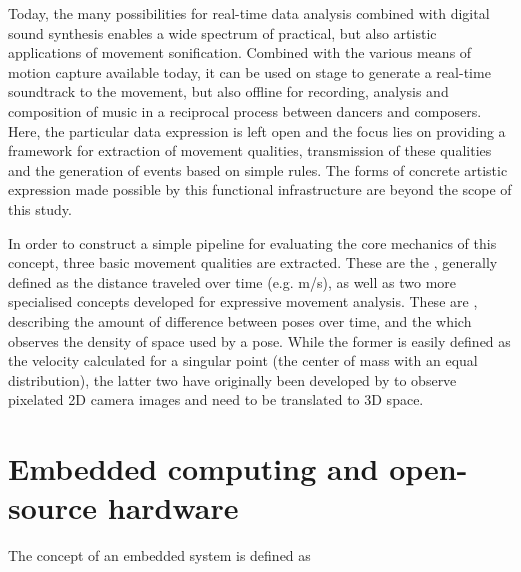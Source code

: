 Today, the many possibilities for real-time data analysis combined with digital sound synthesis enables a wide spectrum of practical, but also artistic applications of movement sonification. Combined with the various means of motion capture available today, it can be used on stage to generate a real-time soundtrack to the movement, but also offline for recording, analysis and composition of music in a reciprocal process between dancers and composers. Here, the particular data expression is left open and the focus lies on providing a framework for extraction of movement qualities, transmission of these qualities and the generation of events based on simple rules. The forms of concrete artistic expression made possible by this functional infrastructure are beyond the scope of this study.

In order to construct a simple pipeline for evaluating the core mechanics of this concept, three basic movement qualities are extracted. These are the , generally defined as the distance traveled over time (e.g. m/s), as well as two more specialised concepts developed for expressive movement analysis. These are  \parencite[96-97]{movementQualities}, describing the amount of difference between poses over time, and the  \parencite[97]{movementQualities} which observes the density of space used by a pose. While the former is easily defined as the velocity calculated for a singular point (the center of mass with an equal distribution), the latter two have originally been developed by to observe pixelated \ac{2D} camera images and need to be translated to \ac{3D} space.


\section{Embedded computing and open-source hardware}
\label{section:embeddedComputing}

The concept of an embedded system is defined as 

